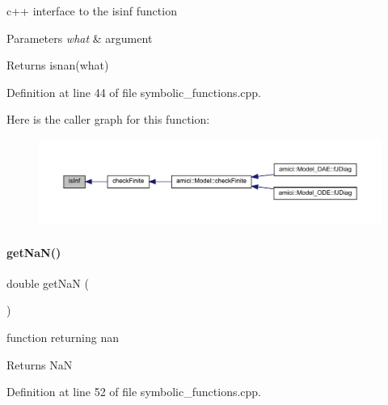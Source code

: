 c++ interface to the isinf function


\begin{DoxyParams}{Parameters}
{\em what} & argument \\
\hline
\end{DoxyParams}
\begin{DoxyReturn}{Returns}
isnan(what) 
\end{DoxyReturn}


Definition at line 44 of file symbolic\+\_\+functions.\+cpp.

Here is the caller graph for this function\+:
\nopagebreak
\begin{figure}[H]
\begin{center}
\leavevmode
\includegraphics[width=350pt]{namespaceamici_a10c0a2eb43575a155a34f5bb280f7973_icgraph}
\end{center}
\end{figure}
\mbox{\label{namespaceamici_ad41a03e53c2aaeeb82aad5791bf3ee28}} 
\paragraph{\texorpdfstring{get\+Na\+N()}{getNaN()}}
{\footnotesize\ttfamily double get\+NaN (\begin{DoxyParamCaption}{ }\end{DoxyParamCaption})}

function returning nan

\begin{DoxyReturn}{Returns}
NaN 
\end{DoxyReturn}


Definition at line 52 of file symbolic\+\_\+functions.\+cpp.

